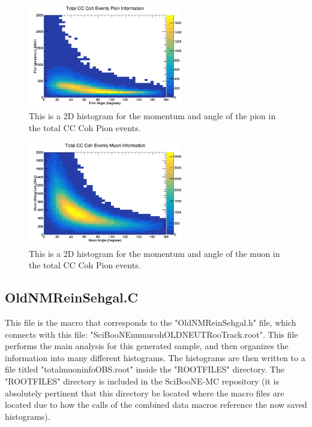 \documentclass[11pt]{article}
\begin{document}
\begin{figure}[H]
\centering
\includegraphics[width=0.6\textwidth]{NewNMBergerSehgalImages/8-TotalCCCohPionInfoNMBS.png}
\caption{This is a 2D histogram for the momentum and angle of the pion in the total CC Coh Pion events.}
\end{figure}

\begin{figure}[H]
\centering
\includegraphics[width=0.6\textwidth]{NewNMBergerSehgalImages/9-TotalCCCohMuonInfoNMBS.png}
\caption{This is a 2D histogram for the momentum and angle of the muon in the total CC Coh Pion events.}
\end{figure}


\subsection{OldNMReinSehgal.C}
This file is the macro that corresponds to the "OldNMReinSehgal.h" file, which connects with this file: "SciBooNE\textunderscore numu\textunderscore coh\textunderscore OLDNEUT\textunderscore RooTrack.root". This file performs the main analysis for this generated sample, and then organizes the information into many different histograms. The histograms are then written to a file titled "totalmuoninfoOBS.root" inside the "ROOTFILES" directory. The "ROOTFILES" directory is included in the SciBooNE-MC repository (it is absolutely pertinent that this directory be located where the macro files are located due to how the calls of the combined data macros reference the now saved histograms).
\end{document}
